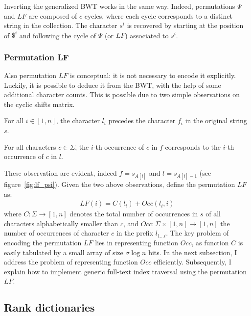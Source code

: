 Inverting the generalized BWT works in the same way.
Indeed, permutations $\Psi$ and $LF$ are composed of $c$ cycles, where each cycle corresponds to a distinct string in the collection.
The character $s^i$ is recovered by starting at the position of $\$^i$ and following the cycle of $\Psi$ (or $LF$) associated to $s^i$.

\subsubsection{Permutation LF}

Also permutation $LF$ is conceptual: it is not necessary to encode it explicitly.
Luckily, it is possible to deduce it from the BWT, with the help of some additional character counts.
This is possible due to two simple observations on the cyclic shifts matrix.

\begin{observation}
\label{obs:lf-a}
\citep{Burrows1994}
For all $i \in [1,n]$, the character $l_i$ precedes the character $f_i$ in the original string $s$.%
\end{observation}
\begin{observation}
\label{obs:lf-b}
\citep{Burrows1994}
For all characters $c \in \Sigma$, the $i$-th occurrence of $c$ in $f$ corresponds to the $i$-th occurrence of $c$ in $l$.
\end{observation}

These observation are evident, indeed $f = s_{A[i]}$ and $l = s_{A[i] - 1}$ (see figure~\ref{fig:lf_psi}).
Given the two above observations, \citeauthor{Ferragina2000} define the permutation $LF$ as:
\begin{eqnarray}
LF(i) = C(l_i) + Occ(l_i, i)
\end{eqnarray}
where $C : \Sigma \rightarrow [1,n]$ denotes the total number of occurrences in $s$ of all characters alphabetically smaller than $c$, and $Occ :  \Sigma \times [1,n] \rightarrow [1,n]$ the number of occurrences of character $c$ in the prefix $l_{1 \dots i}$.
The key problem of encoding the permutation $LF$ lies in representing function $Occ$, as function $C$ is easily tabulated by a small array of size $\sigma \log{n}$ bits.
In the next subsection, I address the problem of representing function $Occ$ efficiently. Subsequently, I explain how to implement generic full-text index traversal using the permutation $LF$.

\subsection{Rank dictionaries}
\label{sec:index:succinct:rd}

